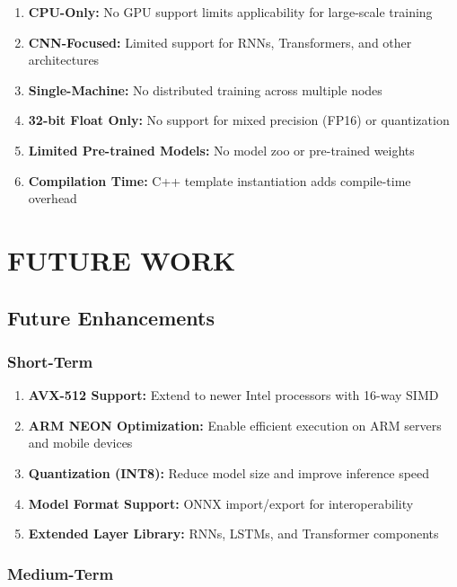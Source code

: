 \documentclass[12pt,oneside,a4paper]{report}
\begin{document}
\begin{enumerate}
    \item \textbf{CPU-Only:} No GPU support limits applicability for large-scale training
    \item \textbf{CNN-Focused:} Limited support for RNNs, Transformers, and other architectures
    \item \textbf{Single-Machine:} No distributed training across multiple nodes
    \item \textbf{32-bit Float Only:} No support for mixed precision (FP16) or quantization
    \item \textbf{Limited Pre-trained Models:} No model zoo or pre-trained weights
    \item \textbf{Compilation Time:} C++ template instantiation adds compile-time overhead
\end{enumerate}

\chapter{FUTURE WORK}

\section{Future Enhancements}

\subsection{Short-Term}

\begin{enumerate}
    \item \textbf{AVX-512 Support:} Extend to newer Intel processors with 16-way SIMD
    \item \textbf{ARM NEON Optimization:} Enable efficient execution on ARM servers and mobile devices
    \item \textbf{Quantization (INT8):} Reduce model size and improve inference speed
    \item \textbf{Model Format Support:} ONNX import/export for interoperability
    \item \textbf{Extended Layer Library:} RNNs, LSTMs, and Transformer components
\end{enumerate}

\subsection{Medium-Term}
\end{document}
